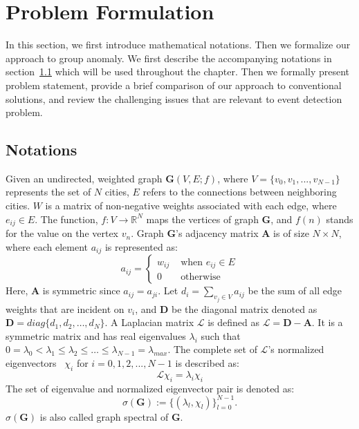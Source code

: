 \section{Problem Formulation}
\label{sec:problem}
In this section, we first introduce mathematical notations. Then we formalize our approach to group anomaly.
We first describe the accompanying notations in section~\ref{sec:notations} which will be used throughout the chapter.
Then we formally present problem statement, provide a brief comparison of our approach to conventional solutions, and review the challenging issues that are relevant to event detection problem.
\subsection{Notations}
\label{sec:notations}
Given an undirected, weighted graph $\mathbf{G}(V,E;f)$, where $V=\{v_0,v_1,...,v_{N-1}\}$ represents the set of $N$ cities, $E$ refers to the connections between neighboring cities. $W$ is a matrix of non-negative weights associated with each edge, where $e_{ij}\in E$. The function, $f: V \rightarrow {\mathbb{R}}^N$ maps the vertices of graph $\mathbf{G}$, and $f(n)$ stands for the value on the vertex $v_n$. Graph $\mathbf{G}$'s adjacency matrix $\mathbf{A}$ is of size $N\times N$, where each element $a_{ij}$ is represented as:
\begin{equation}
a_{ij} = \left\{ \begin{array}{rl}
 w_{ij} &\mbox{ when $e_{ij}\in {E}$} \\
  0 &\mbox{ otherwise}
       \end{array} \right.
\end{equation}
Here, $\mathbf{A}$ is symmetric since $a_{ij}=a_{ji}$.
Let $d_i=\sum\limits_{v_j \in V}a_{ij}$ be the sum of all edge weights that are incident on $v_i$, and $\mathbf{D}$ be the diagonal matrix denoted as $\mathbf{D}=diag\{d_1,d_2,\ldots,d_N\}$. A Laplacian matrix $\mathcal{L}$ is defined as $\mathcal{L}=\mathbf{D-A}$. It is a symmetric matrix and has real eigenvalues $\lambda_{i}$ such that $0 = \lambda_{0} < \lambda_{1} \leq \lambda_{2} \leq \ldots \leq \lambda_{N-1} = \lambda_{max}$. The complete set of $\mathcal{L}$'s normalized eigenvectors~\cite{bapat2010graphs} $\chi_{i}$ for $i=0,1,2,...,N-1$ is described as:
\begin{equation}
\label{eq:eigenvalues}
\mathcal{L}\chi_{i}=\lambda_{i}\chi_{i}
\end{equation}
The set of eigenvalue and normalized eigenvector pair is denoted as:
\begin{equation}
\label{eq:eigenvalues}
\sigma({\mathbf{G}}):=\{(\lambda_l,\chi_l)\}_{l=0}^{N-1}.
\end{equation}$\sigma({\mathbf{G}})$ is also called graph spectral of $\mathbf{G}$.




